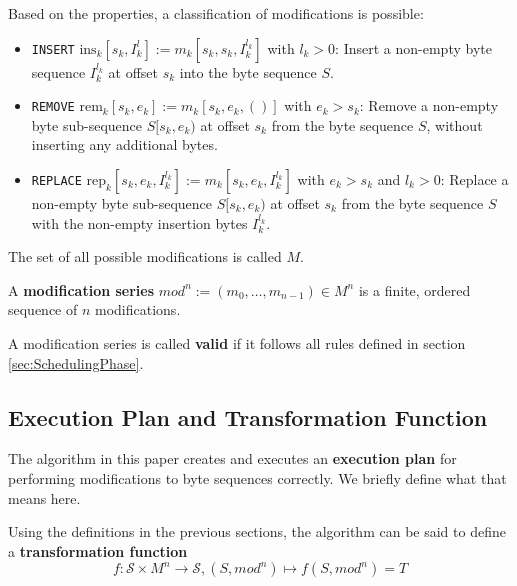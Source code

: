 \documentclass[english, 10pt, openright, twocolumn, landscape, twoside, notitlepage, a4paper, pdftex]		
{article}
\begin{document}
Based on the properties, a classification of modifications is possible:
\begin{itemize}
\item \texttt{INSERT} $\text{ins}_{k}[s_{k},I_{k}^{l}]:=m_{k}[s_{k},s_{k},I_{k}^{l_{k}}]$ with $l_{k}>0$: Insert a non-empty byte sequence $I_{k}^{l_{k}}$ at offset $s_{k}$ into the byte sequence $S$.
\item \texttt{REMOVE} $\text{rem}_{k}[s_{k},e_{k}]:=m_{k}[s_{k},e_{k},()]$ with $e_{k}>s_{k}$: Remove a non-empty byte sub-sequence $S[s_{k},e_{k})$ at offset $s_{k}$ from the byte sequence $S$, without inserting any additional bytes.
\item \texttt{REPLACE} $\text{rep}_{k}[s_{k},e_{k},I_{k}^{l_{k}}]:=m_{k}[s_{k},e_{k},I_{k}^{l_{k}}]$ with $e_{k}>s_{k}$ and $l_{k}>0$: Replace a non-empty byte sub-sequence $S[s_{k},e_{k})$ at offset $s_{k}$ from the byte sequence $S$ with the non-empty insertion bytes $I_{k}^{l_{k}}$.
\end{itemize}

The set of all possible modifications is called $M$.

A \textbf{modification series} $mod^{n} :=(m_{0},\ldots,m_{n-1})\in M^{n}$ is a finite, ordered sequence of $n$ modifications.

A modification series is called \textbf{valid} if it follows all rules defined in section \ref{sec:SchedulingPhase}.


\subsection{Execution Plan and Transformation Function}%
\label{sec:ExecutionPlanandTransformationFunction}%

The algorithm in this paper creates and executes an \textbf{execution plan} for performing modifications to byte sequences correctly. We briefly define what that means here.

Using the definitions in the previous sections, the algorithm can be said to define a \textbf{transformation function} 
\[f:\mathcal{S}\times M^{n} \rightarrow \mathcal{S}, (S,mod^{n}) \mapsto f(S,mod^{n})=T\]
\end{document}
